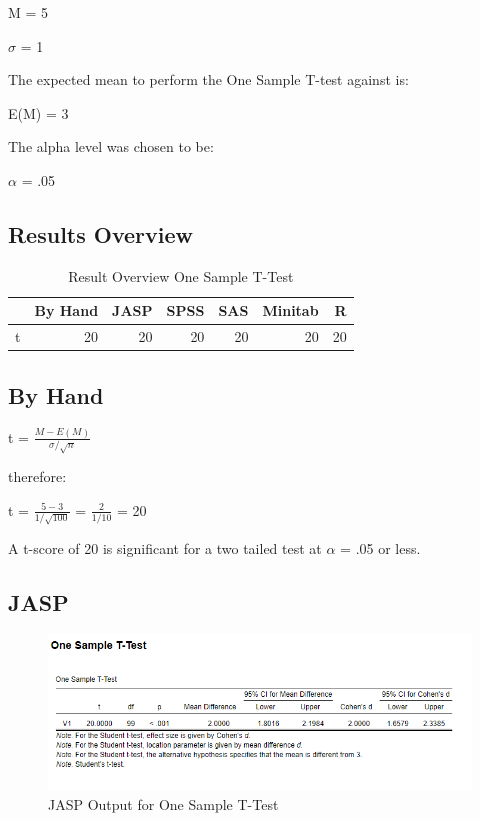 \documentclass[
]{book}
\begin{document}
M = 5

\(\sigma\) = 1

The expected mean to perform the One Sample T-test against is:

E(M) = 3

The alpha level was chosen to be:

\(\alpha\) = .05

\hypertarget{results-overview-4}{%
\subsection{Results Overview}\label{results-overview-4}}

\begin{table}

\caption{\label{tab:unnamed-chunk-32}Result Overview One Sample T-Test}
\centering
\begin{tabular}[t]{lrrrrrr}
\toprule
  & By Hand & JASP & SPSS & SAS & Minitab & R\\
\midrule
t & 20 & 20 & 20 & 20 & 20 & 20\\
\bottomrule
\end{tabular}
\end{table}

\hypertarget{by-hand-4}{%
\subsection{By Hand}\label{by-hand-4}}

t = \(\frac{M - E(M) }{\sigma/\sqrt{n}}\)

therefore:

t = \(\frac{5-3}{1/\sqrt{100}}\) = \(\frac{2}{1/10}\) = 20

A t-score of 20 is significant for a two tailed test at \(\alpha\) = .05 or less.

\hypertarget{jasp-3}{%
\subsection{JASP}\label{jasp-3}}

\begin{figure}[!h]
\includegraphics{Screenshots/One Sample T test/osttJASP} \caption{\label{fig:osttJASP}JASP Output for One Sample T-Test}\label{fig:osttJASP}
\end{figure}
\end{document}
